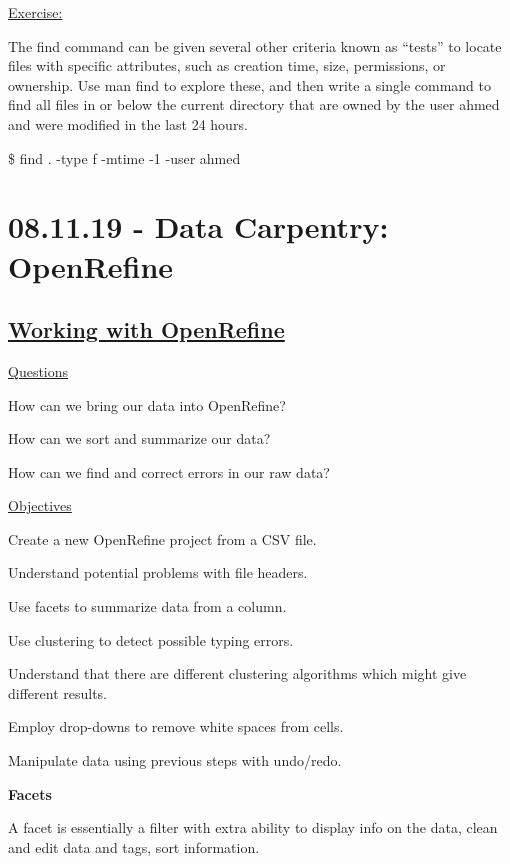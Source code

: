 \documentclass[12pt]{article}
\begin{document}
\begin{addmargin}[1cm]{0cm}
\color{gray}
\underline{Exercise:}

The find command can be given several other criteria known as “tests” to locate files with specific attributes, such as creation time, size, permissions, or ownership. Use man find to explore these, and then write a single command to find all files in or below the current directory that are owned by the user ahmed and were modified in the last 24 hours.

\color{black}\vspace{0.5em}
\$ find . -type f -mtime -1 -user ahmed
\end{addmargin}

\newpage\section{08.11.19 - Data Carpentry: OpenRefine}
\subsection{\href{https://datacarpentry.org/openrefine-socialsci/02-working-with-openrefine/index.html}{\textbf{Working with OpenRefine}}}
\color{gray}
\underline{Questions}

How can we bring our data into OpenRefine?

How can we sort and summarize our data?

How can we find and correct errors in our raw data?

\underline{Objectives}

Create a new OpenRefine project from a CSV file.

Understand potential problems with file headers.

Use facets to summarize data from a column.

Use clustering to detect possible typing errors.

Understand that there are different clustering algorithms which might give different results.

Employ drop-downs to remove white spaces from cells.

Manipulate data using previous steps with undo/redo.

\color{black}

\vspace{2em}
\textbf{Facets}

A facet is essentially a filter with extra ability to display info on the data, clean and edit data and tags, sort information.
\end{document}
